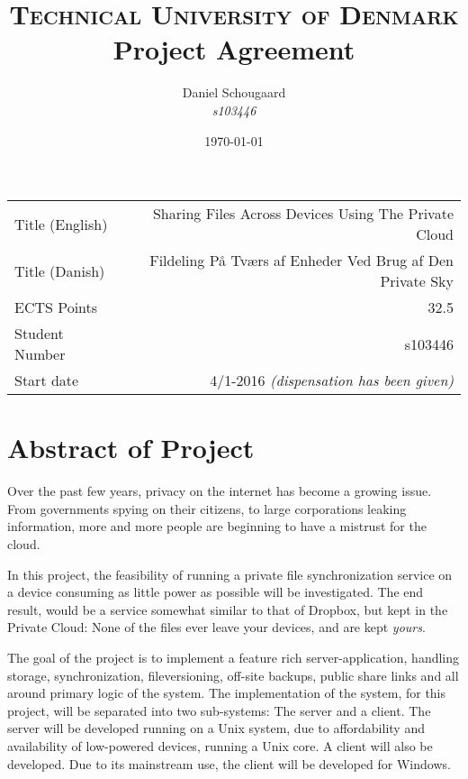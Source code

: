 \documentclass[a4paper,10pt]{article}
\title{	
\textsc{Technical University of Denmark} \\ [25pt] 
\huge Project Agreement
}
\author{Daniel Schougaard \\ \textit{s103446}}
\date{\normalsize\today}
\begin{document}
\maketitle 


\begin{tabular}{ | l | r | }
	Title (English)		&	Sharing Files Across Devices Using The Private Cloud				\\
	Title (Danish)		&	Fildeling På Tværs af Enheder Ved Brug af Den Private Sky			\\
	ECTS Points			&	32.5																\\
	Student Number		&	s103446																\\
	Start date 			&	4/1-2016 \textit{(dispensation has been given)}					\\
\end{tabular}



\section{Abstract of Project}
	Over the past few years, privacy on the internet has become a growing issue. From governments spying on their citizens, to large corporations leaking information, more and more people are beginning to have a mistrust for the cloud.



	In this project, the feasibility of running a private file synchronization service on a device consuming as little power as possible will be investigated. The end result, would be a service somewhat similar to that of Dropbox, but kept in the Private Cloud: None of the files ever leave your devices, and are kept \emph{yours}.



	The goal of the project is to implement a feature rich server-application, handling storage, synchronization, fileversioning, off-site backups, public share links and all around primary logic of the system. The implementation of the system, for this project, will be separated into two sub-systems: The server and a client. The server will be developed running on a Unix system, due to affordability and availability of low-powered devices, running a Unix core. A client will also be developed. Due to its mainstream use, the client will be developed for Windows.
\end{document}
